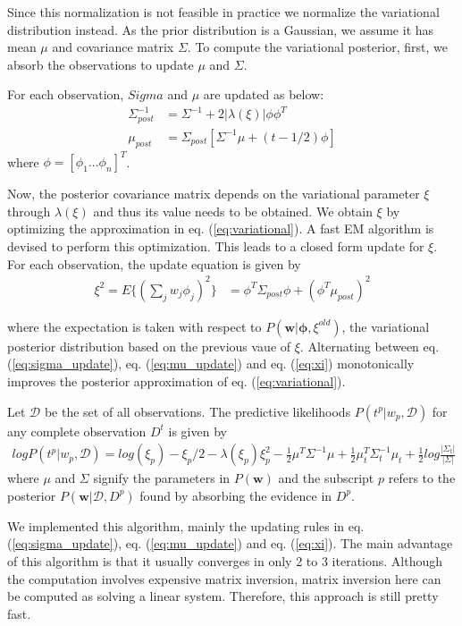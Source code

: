 Since this normalization is not feasible in practice we normalize the variational distribution instead. As the prior distribution is a Gaussian, we assume it has mean $\mu$ and covariance matrix $\Sigma$. To compute the variational posterior, first, we absorb the observations to update $\mu$ and $\Sigma$.

For each observation, $Sigma$ and $\mu$ are updated as below: 
\begin{align}
\label{eq:sigma_update}
\Sigma^{-1}_{post} &= \Sigma^{-1} + 2|\lambda(\xi)|\phi\phi^T\\
\label{eq:mu_update}
\mu_{post} &= \Sigma_{post}[\Sigma^{-1}\mu + (t - 1/2)\phi]
\end{align}
where $\phi = [\phi_1 ...\phi_n]^T$. 

Now, the posterior covariance matrix depends on the variational parameter $\xi$ through $\lambda(\xi)$ and thus its value needs to be obtained. We obtain $\xi$ by optimizing the approximation in eq. (\ref{eq:variational}). A fast EM algorithm is devised to perform this optimization. This leads to a closed form update for $\xi$. For each observation, the update equation is given by 
\begin{align}
\label{eq:xi}
\xi^2 = E\{(\sum_jw_j\phi_j)^2\} &= \phi^T\Sigma_{post}\phi + (\phi^T\mu_{post})^2
\end{align}

where the expectation is taken with respect to $P(\bm{w}|\bm{\phi}, \xi^{old})$, the variational posterior distribution based on the previous vaue of $\xi$. Alternating between eq. (\ref{eq:sigma_update}), eq. (\ref{eq:mu_update}) and eq. (\ref{eq:xi}) monotonically improves the posterior approximation of eq. (\ref{eq:variational}).

Let $\mathcal{D}$ be the set of all observations. The predictive likelihoods $P(t^p | w_p, \mathcal{D})$ for any complete observation $D^t$ is given by
\begin{align}
  logP(t^p|w_p, \mathcal{D}) = log(\xi_p) - \xi_p/2 - \lambda(\xi_p)\xi_p^2 - \frac{1}{2}\mu^T\Sigma^{-1}\mu + \frac{1}{2}\mu^T_t\Sigma^{-1}_t\mu_t + \frac{1}{2}log\frac{|\Sigma_t|}{|\Sigma|}
\end{align}
where $\mu$ and $\Sigma$ signify the parameters in $P(\bm{w})$ and the subscript $p$ refers to the posterior $P(\bm{w}|\mathcal{D}, D^p)$ found by absorbing the evidence in $D^p$.

We implemented this algorithm, mainly the updating rules in eq. (\ref{eq:sigma_update}), eq. (\ref{eq:mu_update}) and eq. (\ref{eq:xi}). The main advantage of this algorithm is that it usually converges in only 2 to 3 iterations. Although the computation involves expensive matrix inversion, matrix inversion here can be computed as solving a linear system. Therefore, this approach is still pretty fast.


